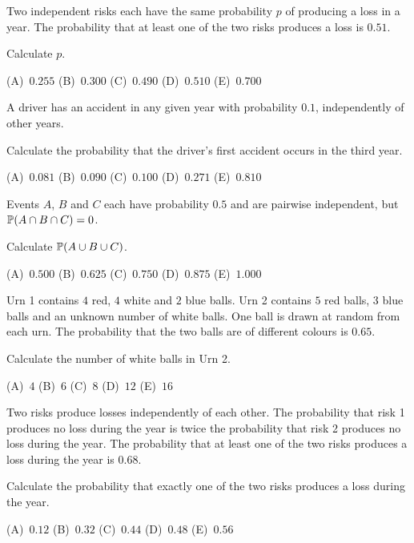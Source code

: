 \begin{practice}
Two independent risks each have the same probability $p$ of producing a loss in a year. The probability that at least one of the two risks produces a loss is $0.51$.

Calculate $p$.

\begin{center}
(A)~$0.255$ \quad (B)~$0.300$ \quad (C)~$0.490$ \quad (D)~$0.510$ \quad (E)~$0.700$
\end{center}
\end{practice}

\begin{practice}
A driver has an accident in any given year with probability $0.1$, independently of other years.

Calculate the probability that the driver's first accident occurs in the third year.

\begin{center}
(A)~$0.081$ \quad (B)~$0.090$ \quad (C)~$0.100$ \quad (D)~$0.271$ \quad (E)~$0.810$
\end{center}
\end{practice}

\begin{practice}
Events $A$, $B$ and $C$ each have probability $0.5$ and are pairwise independent, but $\mathbb{P}(A \cap B \cap C) = 0$.

Calculate $\mathbb{P}(A \cup B \cup C)$.

\begin{center}
(A)~$0.500$ \quad (B)~$0.625$ \quad (C)~$0.750$ \quad (D)~$0.875$ \quad (E)~$1.000$
\end{center}
\end{practice}

\begin{practice}
Urn 1 contains $4$ red, $4$ white and $2$ blue balls. Urn 2 contains $5$ red balls, $3$ blue balls and an unknown number of white balls. One ball is drawn at random from each urn. The probability that the two balls are of different colours is $0.65$.

Calculate the number of white balls in Urn 2.

\begin{center}
(A)~$4$ \quad (B)~$6$ \quad (C)~$8$ \quad (D)~$12$ \quad (E)~$16$
\end{center}
\end{practice}

\begin{practice}
Two risks produce losses independently of each other. The probability that risk 1 produces no loss during the year is twice the probability that risk 2 produces no loss during the year. The probability that at least one of the two risks produces a loss during the year is $0.68$.

Calculate the probability that exactly one of the two risks produces a loss during the year.

\begin{center}
(A)~$0.12$ \quad (B)~$0.32$ \quad (C)~$0.44$ \quad (D)~$0.48$ \quad (E)~$0.56$
\end{center}
\end{practice}

